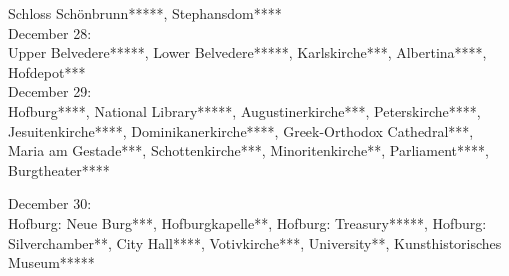 Schloss Sch\"onbrunn*****, Stephansdom****\\

December 28:\\
Upper Belvedere*****, Lower Belvedere*****, Karlskirche***, Albertina****, Hofdepot***\\

December 29:\\
Hofburg****, National Library*****, Augustinerkirche***, Peterskirche****, Jesuitenkirche****, Dominikanerkirche****, Greek-Orthodox Cathedral***, Maria am Gestade***, Schottenkirche***, Minoritenkirche**, Parliament****, Burgtheater****

December 30:\\
Hofburg: Neue Burg***, Hofburgkapelle**, Hofburg: Treasury*****, Hofburg: Silverchamber**, City Hall****, Votivkirche***, University**, Kunsthistorisches Museum*****